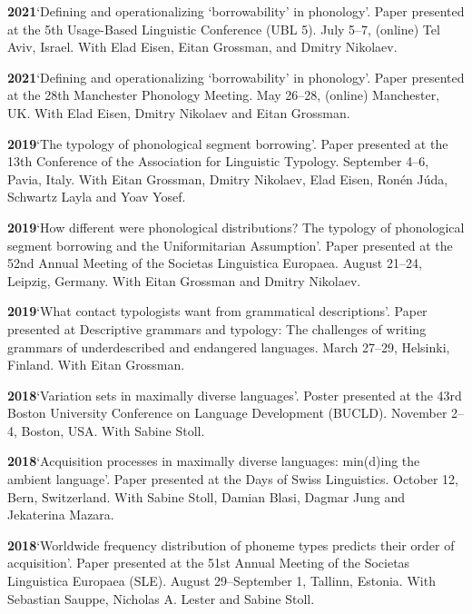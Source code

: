 \documentclass[11pt]{article}
\newcommand{\hangpara}{
 \setlength{\parindent}{0in} %
 \hangindent=0.42in %
}
\begin{document}
\hangpara
\vskip 6pt
{\bf 2021}\hspace{1ex}`Defining and operationalizing	 `borrowability' in phonology'. Paper presented at the 5th Usage-Based Linguistic Conference (UBL 5). July 5--7, (online) Tel Aviv, Israel. With Elad Eisen, Eitan Grossman, and Dmitry Nikolaev.

\hangpara
\vskip 6pt
{\bf 2021}\hspace{1ex}`Defining and operationalizing	 `borrowability' in phonology'. Paper presented at the 28th Manchester Phonology Meeting. May 26--28, (online) Manchester, UK. With Elad Eisen, Dmitry Nikolaev and Eitan Grossman.

\hangpara
\vskip 6pt
{\bf 2019}\hspace{1ex}`The typology of phonological segment borrowing'. Paper presented at the 
13th Conference of the Association for Linguistic Typology. September 4--6, Pavia, Italy. With Eitan Grossman, Dmitry Nikolaev, Elad Eisen, Ronén Júda, Schwartz Layla and Yoav Yosef.

\hangpara
\vskip 6pt
{\bf 2019}\hspace{1ex}`How different were phonological distributions?
The typology of phonological segment borrowing and the Uniformitarian
Assumption'. Paper presented at the 52nd Annual Meeting of the Societas Linguistica Europaea. August 21--24, Leipzig, Germany. With Eitan Grossman and Dmitry Nikolaev.

\hangpara
\vskip 6pt
{\bf 2019}\hspace{1ex}`What contact typologists want from grammatical descriptions'. Paper presented at Descriptive grammars and typology: The challenges of writing grammars of underdescribed and endangered languages. March 27--29, Helsinki, Finland. With Eitan Grossman.

\hangpara
\vskip 6pt
{\bf 2018}\hspace{1ex}`Variation sets in maximally diverse languages'. Poster presented at the 43rd Boston University Conference on Language Development (BUCLD). November 2--4, Boston, USA. With Sabine Stoll.

\hangpara
\vskip 6pt
{\bf 2018}\hspace{1ex}`Acquisition processes in maximally diverse languages: min(d)ing the ambient language'. Paper presented at the Days of Swiss Linguistics. October 12, Bern, Switzerland. With Sabine Stoll, Damian Blasi, Dagmar Jung and Jekaterina Mazara.

\vskip 6pt
\hangpara
{\bf 2018}\hspace{1ex}`Worldwide frequency distribution of phoneme types predicts their order of acquisition'. Paper presented at the 51st Annual Meeting of the Societas Linguistica Europaea (SLE). August 29--September 1, Tallinn, Estonia. With Sebastian Sauppe, Nicholas A. Lester and Sabine Stoll.
\end{document}
